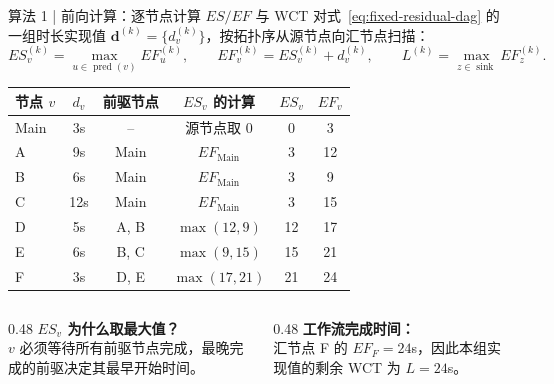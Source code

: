 \begin{frame}{算法 1 | 前向计算：逐节点计算 $ES/EF$ 与 WCT}
  \small
  对式~\eqref{eq:fixed-residual-dag} 的一组时长实现值
  $\boldsymbol d^{(k)}=\{d_v^{(k)}\}$，按拓扑序从源节点向汇节点扫描：
  \begin{equation}
    ES_v^{(k)}
    =
    \max_{u\in\operatorname{pred}(v)}EF_u^{(k)},
    \qquad
    EF_v^{(k)}=ES_v^{(k)}+d_v^{(k)},
    \qquad
    L^{(k)}=\max_{z\in\operatorname{sink}}EF_z^{(k)}.
    \label{eq:cpm-forward}
  \end{equation}

  \scriptsize
  \centering
  \renewcommand{\arraystretch}{1.10}
  \begin{tabular}{lccccc}
    \toprule
    节点 $v$ & $d_v$ & 前驱节点 & $ES_v$ 的计算 & $ES_v$ & $EF_v$ \\
    \midrule
    Main & 3s  & --     & 源节点取 0         & 0  & 3  \\
    A    & 9s  & Main   & $EF_{\mathrm{Main}}$ & 3  & 12 \\
    B    & 6s  & Main   & $EF_{\mathrm{Main}}$ & 3  & 9  \\
    C    & 12s & Main   & $EF_{\mathrm{Main}}$ & 3  & 15 \\
    D    & 5s  & A, B   & $\max(12,9)$         & 12 & 17 \\
    E    & 6s  & B, C   & $\max(9,15)$         & 15 & 21 \\
    F    & 3s  & D, E   & $\max(17,21)$        & 21 & 24 \\
    \bottomrule
  \end{tabular}

  \vspace{0.10cm}
  \begin{columns}[T,onlytextwidth]
    \begin{column}{0.48\textwidth}
      \textbf{$ES_v$ 为什么取最大值？}\\
      $v$ 必须等待所有前驱节点完成，最晚完成的前驱决定其最早开始时间。
    \end{column}
    \begin{column}{0.48\textwidth}
      \textbf{工作流完成时间：}\\
      汇节点 F 的 $EF_F=24$s，因此本组实现值的剩余 WCT 为 $L=24$s。
    \end{column}
  \end{columns}
\end{frame}

